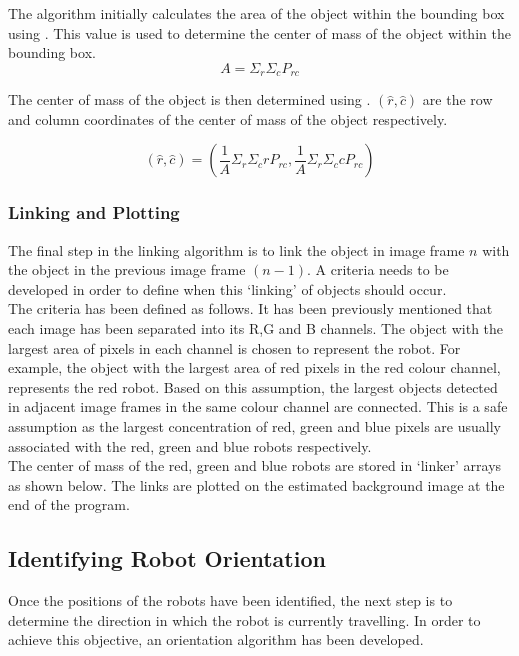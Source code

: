 \documentclass{article}
\begin{document}
The algorithm initially calculates the area of the object within the bounding box using . This value is used to determine the center of mass of the object within the bounding box.\\

\begin{equation}
A = \Sigma_{r}\Sigma_{c}P_{rc}
\label{eqn:area}
\end{equation}

The center of mass of the object is then determined using . $(\widehat{r}, \widehat{c})$ are the row and column coordinates of the center of mass of the object respectively.

\begin{equation}
(\widehat{r}, \widehat{c}) = (\frac{1}{A}\Sigma_{r}\Sigma_{c}r P_{rc}, \frac{1}{A}\Sigma_{r}\Sigma_{c}c P_{rc})
\label{eqn:cm}
\end{equation}

\subsubsection{Linking and Plotting}
\label{sec:linkplot}
The final step in the linking algorithm is to link the object in image frame $n$ with the object in the previous image frame $(n-1)$. A criteria needs to be developed in order to define when this `linking' of objects should occur. \\

The criteria has been defined as follows. It has been previously mentioned that each image has been separated into its R,G and B channels. The object with the largest area of pixels in each channel is chosen to represent the robot. For example, the object with the largest area of red pixels in the red colour channel, represents the red robot. Based on this assumption, the largest objects detected in adjacent image frames in the same colour channel are connected. This is a safe assumption as the largest concentration of  red, green and blue pixels are usually associated with the red, green and blue robots respectively. \\

The center of mass of the red, green and blue robots are stored in `linker' arrays as shown below. The links are plotted on the estimated background image at the end of the program.\\



\subsection{Identifying Robot Orientation}
\label{sec:direction}
Once the positions of the robots have been identified, the next step is to determine the direction in which the robot is currently travelling. In order to achieve this objective, an orientation algorithm has been developed.  \\
\end{document}
